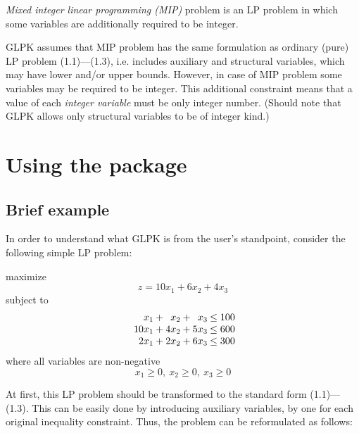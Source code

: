 {\it Mixed integer linear programming (MIP)} problem is an LP problem
in which some variables are additionally required to be integer.

GLPK assumes that MIP problem has the same formulation as ordinary
(pure) LP problem (1.1)---(1.3), i.e. includes auxiliary and structural
variables, which may have lower and/or upper bounds. However, in case
of MIP problem some variables may be required to be integer. This
additional constraint means that a value of each {\it integer variable}
must be only integer number. (Should note that GLPK allows only
structural variables to be of integer kind.)

\section{Using the package}

\subsection{Brief example}

In order to understand what GLPK is from the user's standpoint,
consider the following simple LP problem:

\medskip

\noindent
\hspace{.5in} maximize
$$z = 10 x_1 + 6 x_2 + 4 x_3$$
\hspace{.5in} subject to
$$
\begin{array}{r@{\:}c@{\:}r@{\:}c@{\:}r@{\:}c@{\:}r}
x_1 &+&x_2 &+&x_3 &\leq 100 \\
10 x_1 &+& 4 x_2 & +&5 x_3 & \leq 600 \\
2 x_1 &+& 2 x_2 & +& 6 x_3 & \leq 300 \\
\end{array}
$$
\hspace{.5in} where all variables are non-negative
$$x_1 \geq 0, \ x_2 \geq 0, \ x_3 \geq 0$$

At first, this LP problem should be transformed to the standard form
(1.1)---(1.3). This can be easily done by introducing auxiliary
variables, by one for each original inequality constraint. Thus, the
problem can be reformulated as follows:

\medskip

